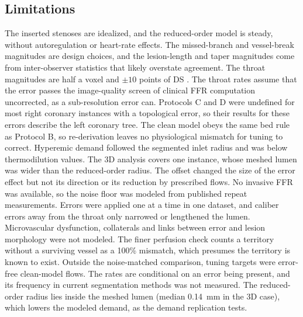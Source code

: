 \documentclass[journal,twoside,web]{ieeecolor}
\begin{document}
\subsection{Limitations}
The inserted stenoses are idealized, and the reduced-order model is steady, without autoregulation or heart-rate
effects. The missed-branch and vessel-break magnitudes are design choices, and the lesion-length and taper magnitudes come from
inter-observer statistics that likely overstate agreement. The throat magnitudes are half a voxel and $\pm 10$ points of DS \cite{boogers2010,gouya2009}. The throat rates assume that the error passes the image-quality screen of clinical FFR computation \cite{norgaard2014}
uncorrected, as a sub-resolution error can. Protocols C and D were undefined for most right coronary
instances with a topological error, so their results for these errors describe the left coronary tree. The clean model obeys the same bed rule as Protocol B, so re-derivation leaves no physiological mismatch for tuning to correct. Hyperemic demand followed the segmented inlet radius and was below thermodilution values. The 3D analysis covers one instance, whose meshed lumen was wider than the reduced-order radius. The offset changed the size of the error effect but not its direction or its reduction by prescribed flows. No invasive FFR was available, so the noise floor was modeled from published repeat
measurements. Errors were applied one at a time in one dataset, and caliber errors away from the throat only narrowed or lengthened the lumen. Microvascular
dysfunction, collaterals and links between error and lesion morphology were not modeled. The finer perfusion check counts a territory without a surviving vessel as a 100\% mismatch, which presumes the territory is known to exist. Outside the noise-matched comparison, tuning targets
were error-free clean-model flows. The rates are conditional on an error being present, and its frequency in current
segmentation methods was not measured. The reduced-order radius lies inside the
meshed lumen (median 0.14~mm in the 3D case), which lowers the modeled demand, as the demand replication tests.
\end{document}
